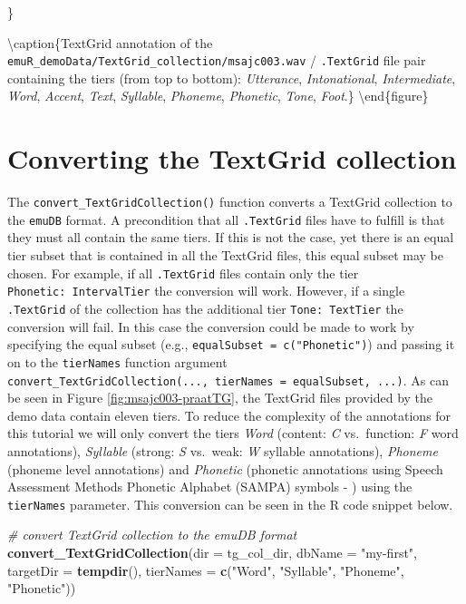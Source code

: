 \documentclass[]{book}
\newenvironment{Shaded}{\begin{snugshade}}{\end{snugshade}}
\newcommand{\CommentTok}[1]{\textcolor[rgb]{0.56,0.35,0.01}{\textit{#1}}}
\newcommand{\DataTypeTok}[1]{\textcolor[rgb]{0.13,0.29,0.53}{#1}}
\newcommand{\KeywordTok}[1]{\textcolor[rgb]{0.13,0.29,0.53}{\textbf{#1}}}
\newcommand{\NormalTok}[1]{#1}
\newcommand{\StringTok}[1]{\textcolor[rgb]{0.31,0.60,0.02}{#1}}
\begin{document}
\}

\textbackslash{}caption\{TextGrid annotation of the \texttt{emuR\_demoData/TextGrid\_collection/msajc003.wav} / \texttt{.TextGrid} file pair containing the tiers (from top to bottom): \emph{Utterance}, \emph{Intonational}, \emph{Intermediate}, \emph{Word}, \emph{Accent}, \emph{Text}, \emph{Syllable}, \emph{Phoneme}, \emph{Phonetic}, \emph{Tone}, \emph{Foot}.\}\label{fig:msajc003-praatTG}
\textbackslash{}end\{figure\}

\hypertarget{converting-the-textgrid-collection}{%
\section{Converting the TextGrid collection}\label{converting-the-textgrid-collection}}

The \texttt{convert\_TextGridCollection()} function converts a TextGrid collection to the \texttt{emuDB} format. A precondition that all \texttt{.TextGrid} files have to fulfill is that they must all contain the same tiers. If this is not the case, yet there is an equal tier subset that is contained in all the TextGrid files, this equal subset may be chosen. For example, if all \texttt{.TextGrid} files contain only the tier \texttt{Phonetic:\ IntervalTier} the conversion will work. However, if a single \texttt{.TextGrid} of the collection has the additional tier \texttt{Tone:\ TextTier} the conversion will fail. In this case the conversion could be made to work by specifying the equal subset (e.g., \texttt{equalSubset\ =\ c("Phonetic")}) and passing it on to the \texttt{tierNames} function argument \texttt{convert\_TextGridCollection(...,\ tierNames\ =\ equalSubset,\ ...)}. As can be seen in Figure \ref{fig:msajc003-praatTG}, the TextGrid files provided by the demo data contain eleven tiers. To reduce the complexity of the annotations for this tutorial we will only convert the tiers \emph{Word} (content: \emph{C} vs.~function: \emph{F} word annotations), \emph{Syllable} (strong: \emph{S} vs.~weak: \emph{W} syllable annotations), \emph{Phoneme} (phoneme level annotations) and \emph{Phonetic} (phonetic annotations using Speech Assessment Methods Phonetic Alphabet (SAMPA) symbols - \citet{wells:1997aa}) using the \texttt{tierNames} parameter. This conversion can be seen in the R code snippet below.

\begin{Shaded}
\begin{Highlighting}[]
\CommentTok{# convert TextGrid collection to the emuDB format}
\KeywordTok{convert_TextGridCollection}\NormalTok{(}\DataTypeTok{dir =}\NormalTok{ tg_col_dir,}
                           \DataTypeTok{dbName =} \StringTok{"my-first"}\NormalTok{,}
                           \DataTypeTok{targetDir =} \KeywordTok{tempdir}\NormalTok{(),}
                           \DataTypeTok{tierNames =} \KeywordTok{c}\NormalTok{(}\StringTok{"Word"}\NormalTok{, }\StringTok{"Syllable"}\NormalTok{,}
                                         \StringTok{"Phoneme"}\NormalTok{, }\StringTok{"Phonetic"}\NormalTok{))}
\end{Highlighting}
\end{Shaded}
\end{document}
